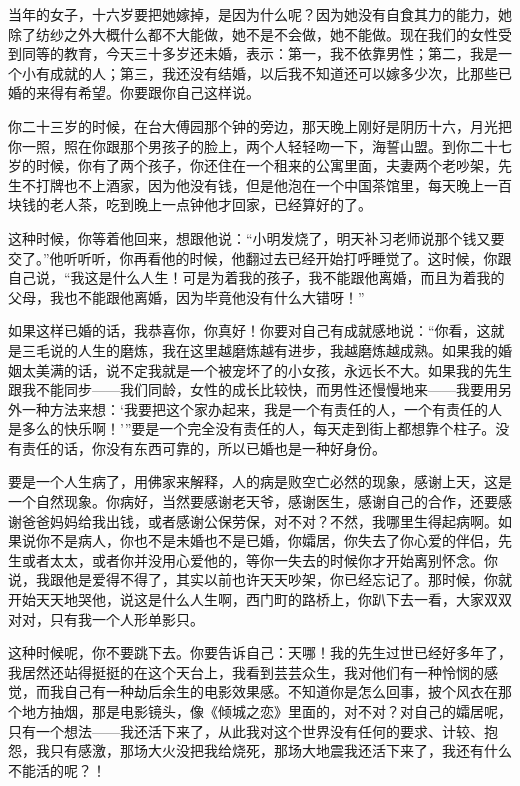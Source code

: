 \par 当年的女子，十六岁要把她嫁掉，是因为什么呢？因为她没有自食其力的能力，她除了纺纱之外大概什么都不大能做，她不是不会做，她不能做。现在我们的女性受到同等的教育，今天三十多岁还未婚，表示：第一，我不依靠男性；第二，我是一个小有成就的人；第三，我还没有结婚，以后我不知道还可以嫁多少次，比那些已婚的来得有希望。你要跟你自己这样说。
\par 你二十三岁的时候，在台大傅园那个钟的旁边，那天晚上刚好是阴历十六，月光把你一照，照在你跟那个男孩子的脸上，两个人轻轻吻一下，海誓山盟。到你二十七岁的时候，你有了两个孩子，你还住在一个租来的公寓里面，夫妻两个老吵架，先生不打牌也不上酒家，因为他没有钱，但是他泡在一个中国茶馆里，每天晚上一百块钱的老人茶，吃到晚上一点钟他才回家，已经算好的了。
\par 这种时候，你等着他回来，想跟他说：“小明发烧了，明天补习老师说那个钱又要交了。”他听听听，你再看他的时候，他翻过去已经开始打呼睡觉了。这时候，你跟自己说，“我这是什么人生！可是为着我的孩子，我不能跟他离婚，而且为着我的父母，我也不能跟他离婚，因为毕竟他没有什么大错呀！”
\par 如果这样已婚的话，我恭喜你，你真好！你要对自己有成就感地说：“你看，这就是三毛说的人生的磨炼，我在这里越磨炼越有进步，我越磨炼越成熟。如果我的婚姻太美满的话，说不定我就是一个被宠坏了的小女孩，永远长不大。如果我的先生跟我不能同步——我们同龄，女性的成长比较快，而男性还慢慢地来——我要用另外一种方法来想：‘我要把这个家办起来，我是一个有责任的人，一个有责任的人是多么的快乐啊！’”要是一个完全没有责任的人，每天走到街上都想靠个柱子。没有责任的话，你没有东西可靠的，所以已婚也是一种好身份。
\par 要是一个人生病了，用佛家来解释，人的病是败空亡必然的现象，感谢上天，这是一个自然现象。你病好，当然要感谢老天爷，感谢医生，感谢自己的合作，还要感谢爸爸妈妈给我出钱，或者感谢公保劳保，对不对？不然，我哪里生得起病啊。如果说你不是病人，你也不是未婚也不是已婚，你孀居，你失去了你心爱的伴侣，先生或者太太，或者你并没用心爱他的，等你一失去的时候你才开始离别怀念。你说，我跟他是爱得不得了，其实以前也许天天吵架，你已经忘记了。那时候，你就开始天天地哭他，说这是什么人生啊，西门町的路桥上，你趴下去一看，大家双双对对，只有我一个人形单影只。
\par 这种时候呢，你不要跳下去。你要告诉自己：天哪！我的先生过世已经好多年了，我居然还站得挺挺的在这个天台上，我看到芸芸众生，我对他们有一种怜悯的感觉，而我自己有一种劫后余生的电影效果感。不知道你是怎么回事，披个风衣在那个地方抽烟，那是电影镜头，像《倾城之恋》里面的，对不对？对自己的孀居呢，只有一个想法——我还活下来了，从此我对这个世界没有任何的要求、计较、抱怨，我只有感激，那场大火没把我给烧死，那场大地震我还活下来了，我还有什么不能活的呢？！
